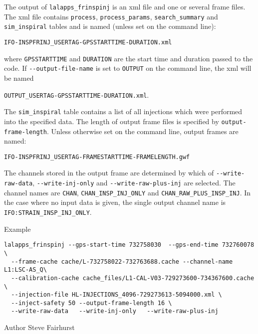 \begin{entry}
The output of \verb$lalapps_frinspinj$ is an xml file and one or several
frame files.  The xml file contains
\verb$process$, \verb$process_params$, \verb$search_summary$ and
\verb$sim_inspiral$ tables and is named (unless set on the command line):
\begin{center}
\texttt{IFO-INSPFRINJ\_USERTAG-GPSSTARTTIME-DURATION.xml}\\
\end{center}
where \texttt{GPSSTARTTIME} and \texttt{DURATION} are the start time and
duration passed to the code.  If \verb$--output-file-name$ is set to
\verb$OUTPUT$ on the command line, the xml will be named
\begin{center}
\texttt{OUTPUT\_USERTAG-GPSSTARTTIME-DURATION.xml}.\\
\end{center}
The \verb$sim_inspiral$ table contains a list of all injections which
were performed into the specified data.  The length of output frame
files is specified by \verb$output-frame-length$.  Unless otherwise set
on the command line, output frames are named: 
\begin{center}
\texttt{IFO-INSPFRINJ\_USERTAG-FRAMESTARTTIME-FRAMELENGTH.gwf}\\
\end{center}
The channels stored in the output frame are determined by which of
\verb$--write-raw-data$, \verb$--write-inj-only$ and
\verb$--write-raw-plus-inj$ are selected.  The channel names are
\verb$CHAN$, \verb$CHAN_INSP_INJ_ONLY$ and
\verb$CHAN_RAW_PLUS_INSP_INJ$.  In the case where no input data is
given, the single output channel name is \verb$IFO:STRAIN_INSP_INJ_ONLY$.

\item[Example]
\begin{verbatim}
lalapps_frinspinj --gps-start-time 732758030  --gps-end-time 732760078 \
  --frame-cache cache/L-732758022-732763688.cache --channel-name L1:LSC-AS_Q\	
  --calibration-cache cache_files/L1-CAL-V03-729273600-734367600.cache \
  --injection-file HL-INJECTIONS_4096-729273613-5094000.xml \
  --inject-safety 50 --output-frame-length 16 \
  --write-raw-data   --write-inj-only   --write-raw-plus-inj 
\end{verbatim}

\item[Author] 
Steve Fairhurst
\end{entry}

